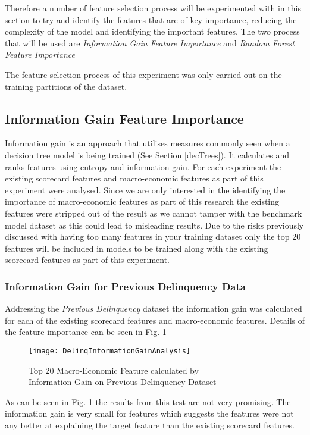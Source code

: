 Therefore a number of feature selection process will be experimented with in this section to try and identify the features that are of key importance, reducing the complexity of the model and identifying the important features. The two process that will be used are \textit{Information Gain Feature Importance} and \textit{Random Forest Feature Importance}

The feature selection process of this experiment was only carried out on the training partitions of the dataset.

\subsection{Information Gain Feature Importance}
Information gain is an approach that utilises measures commonly seen when a decision tree model is being trained (See Section \ref{decTrees}). It calculates and ranks features using entropy and information gain. For each experiment the existing scorecard features and macro-economic features as part of this experiment were analysed. Since we are only interested in the identifying the importance of macro-economic features as part of this research the existing features were stripped out of the result as we cannot tamper with the benchmark model dataset as this could lead to misleading results. Due to the risks previously discussed with having too many features in your training dataset only the top 20 features will be included in models to be trained along with the existing scorecard features as part of this experiment.

\subsubsection{Information Gain for Previous Delinquency Data} \label{IGPDExper}
Addressing the \textit{Previous Delinquency} dataset the information gain was calculated for each of the existing scorecard features and macro-economic features. Details of the feature importance can be seen in Fig. \ref{fig:DelinqInformationGainAnalysis}

\begin{figure}[H]
	\texttt{[image: DelinqInformationGainAnalysis]}
	\caption{Top 20 Macro-Economic Feature calculated by \\ Information Gain on Previous Delinquency Dataset}
	\label{fig:DelinqInformationGainAnalysis}
\end{figure}

As can be seen in Fig. \ref{fig:DelinqInformationGainAnalysis} the results from this test are not very promising. The information gain is very small for features which suggests the features were not any better at explaining the target feature than the existing scorecard features. 

